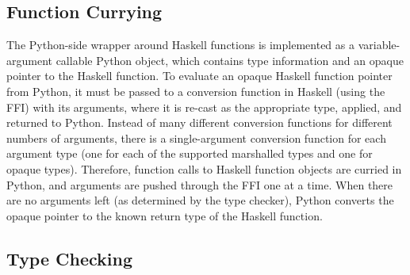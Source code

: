 \documentclass[11pt, letterpaper, oneside, twocolumn] {article}
\begin{document}
\subsection{Function Currying}
\label{sec:imp_currying}

The Python-side wrapper around Haskell functions is implemented as a variable-argument callable Python object, which contains type information and an opaque pointer to the Haskell function.  To evaluate an opaque Haskell function pointer from Python, it must be passed to a conversion function in Haskell (using the FFI) with its arguments, where it is re-cast as the appropriate type, applied, and returned to Python.  Instead of many different conversion functions for different numbers of arguments, there is a single-argument conversion function for each argument type (one for each of the supported marshalled types and one for opaque types).  Therefore, function calls to Haskell function objects are curried in Python, and arguments are pushed through the FFI one at a time.  When there are no arguments left (as determined by the type checker), Python converts the opaque pointer to the known return type of the Haskell function.

\subsection{Type Checking}
\end{document}
